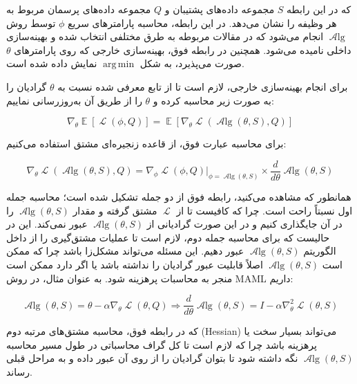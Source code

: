 \documentclass{article}
\DeclareMathOperator*{\argmin}{arg\,min}
\DeclareMathOperator{\Loss}{\mathcal{L}}
\DeclareMathOperator{\Alg}{\mathcal{A}lg}
\DeclareMathOperator{\E}{\mathbb{E}}
\begin{document}
که در این رابطه 
$S$
مجموعه داده‌های پشتیبان 
 و 
$Q$
مجموعه داده‌های پرسمان
  مربوط به هر وظیفه 
   را نشان می‌دهد. در این رابطه، محاسبه پارامترهای سریع $\phi$ توسط روش 
$\Alg$
انجام می‌شود که در مقالات مربوطه به طرق مختلفی انتخاب شده و بهینه‌سازی داخلی 
نامیده می‌شود. همچنین در رابطه فوق، بهینه‌سازی خارجی 
که روی پارامترهای $\theta$ صورت می‌پذیرد، به شکل 
$\argmin$
نمایش داده شده است. 

برای انجام بهینه‌سازی خارجی، لازم است تا از تابع معرفی شده نسبت به 
$\theta$
گرادیان را به صورت زیر محاسبه کرده و $\theta$ را از طریق آن به‌روزرسانی نماییم:

\begin{equation} \label{eq:1}
		\nabla_{\theta} \E [\Loss (\phi, Q)] = 
		\E [\nabla_{\theta} \Loss (\Alg(\theta, S), Q)]
\end{equation}

برای محاسبه عبارت فوق، از قاعده زنجیره‌ای مشتق استفاده می‌کنیم:

\begin{equation}		\label{eq:2}
		\nabla_{\theta} \Loss (\Alg(\theta, S), Q) 		= \nabla_{\phi} \Loss (\phi, Q) |_{\phi = \Alg(\theta, S)} 
		\times \frac{d}{d\theta}\Alg(\theta, S)
\end{equation}

همانطور که مشاهده می‌کنید، رابطه فوق از دو جمله تشکیل شده است؛ محاسبه جمله اول نسبتاً راحت است. چرا که کافیست تا از 
$\Loss$
مشتق گرفته و مقدار 
$\Alg(\theta, S)$
را در آن جایگذاری کنیم و در این صورت گرادیانی از 
$\Alg(\theta, S)$
عبور نمی‌کند. این در حالیست که برای محاسبه جمله دوم، لازم است تا عملیات مشتق‌گیری را از داخل الگوریتم $\Alg(\theta, S)$ عبور دهیم. این مسئله می‌تواند مشکل‌زا باشد چرا که ممکن است $\Alg(\theta, S)$ اصلاً قابلیت عبور گرادیان را نداشته باشد یا اگر دارد ممکن است منجر به محاسبات پرهزینه شود. به عنوان مثال، در روش MAML داریم:

\begin{equation}		\label{eq:3}
	\Alg(\theta,S) = \theta - \alpha \nabla_\theta \Loss (\theta, Q) \Rightarrow \frac{d}{d\theta}\Alg(\theta, S) = I - \alpha \nabla^2_\theta \Loss (\theta, S)
\end{equation}
 
 که در رابطه فوق، محاسبه مشتق‌های مرتبه دوم (Hessian) می‌تواند بسیار سخت یا پرهزینه باشد چرا که لازم است تا کل گراف محاسباتی در طول مسیر محاسبه
 $\Alg(\theta, S)$
  نگه داشته شود تا بتوان گرادیان را از روی آن عبور داده و به مراحل قبلی رساند.
    
\end{document}
